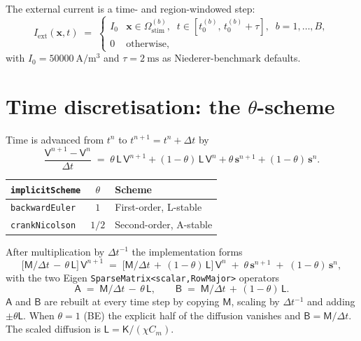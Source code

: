\documentclass[11pt,a4paper]{article}
\newcommand{\Iext}{I_{\text{ext}}}
\newcommand{\Aimp}{\mathsf{A}}
\newcommand{\Bimp}{\mathsf{B}}
\newcommand{\Mmass}{\mathsf{M}}
\newcommand{\Kstif}{\mathsf{K}}
\newcommand{\Lop}{\mathsf{L}}
\newcommand{\code}[1]{\texttt{\small #1}}
\begin{document}
The external current is a time- and region-windowed step:
\begin{equation}
  \Iext(\mathbf{x}, t) \;=\;
  \begin{cases}
    I_{0} & \mathbf{x} \in \Omega_{\text{stim}}^{(b)},
            \;\; t \in [t_{0}^{(b)},\, t_{0}^{(b)} + \tau],
            \;\; b = 1, \dots, B, \\
    0     & \text{otherwise},
  \end{cases}
\end{equation}
with $I_{0} = \SI{50000}{\ampere\per\meter\cubed}$ and
$\tau = \SI{2}{\milli\second}$ as Niederer-benchmark defaults.

\section{Time discretisation: the $\theta$-scheme}

Time is advanced from $t^{n}$ to $t^{n+1} = t^{n} + \Delta t$ by
\begin{equation}
  \frac{\mathsf{V}^{n+1} - \mathsf{V}^{n}}{\Delta t}
   \;=\;
   \theta\, \Lop\, \mathsf{V}^{n+1}
   + (1-\theta)\, \Lop\, \mathsf{V}^{n}
   + \theta\, \mathbf{s}^{n+1}
   + (1-\theta)\, \mathbf{s}^{n}.
   \label{eq:theta}
\end{equation}

\begin{center}
\begin{tabular}{@{}lcl@{}}
\toprule
\code{implicitScheme} & $\theta$ & Scheme \\
\midrule
\code{backwardEuler} & $1$   & First-order, L-stable \\
\code{crankNicolson} & $1/2$ & Second-order, A-stable \\
\bottomrule
\end{tabular}
\end{center}

After multiplication by $\Delta t^{-1}$ the implementation forms
\begin{equation}
  \bigl[\Mmass/\Delta t \,-\, \theta\, \Lop\bigr]\, \mathsf{V}^{n+1}
   \;=\;
   \bigl[\Mmass/\Delta t \,+\, (1-\theta)\, \Lop\bigr]\, \mathsf{V}^{n}
   \;+\; \theta\, \mathbf{s}^{n+1}
   \;+\; (1-\theta)\, \mathbf{s}^{n},
   \label{eq:implicit-system}
\end{equation}
with the two Eigen \code{SparseMatrix<scalar,RowMajor>} operators
\begin{equation}
  \Aimp \;=\; \Mmass/\Delta t \,-\, \theta\, \Lop,
   \qquad
  \Bimp \;=\; \Mmass/\Delta t \,+\, (1-\theta)\, \Lop.
   \label{eq:AB}
\end{equation}
$\Aimp$ and $\Bimp$ are rebuilt at every time step by copying $\Mmass$,
scaling by $\Delta t^{-1}$ and adding $\pm \theta \Lop$. When
$\theta = 1$ (BE) the explicit half of the diffusion vanishes and
$\Bimp = \Mmass/\Delta t$. The scaled diffusion is
$\Lop = \Kstif / (\chi C_{m})$.
\end{document}
